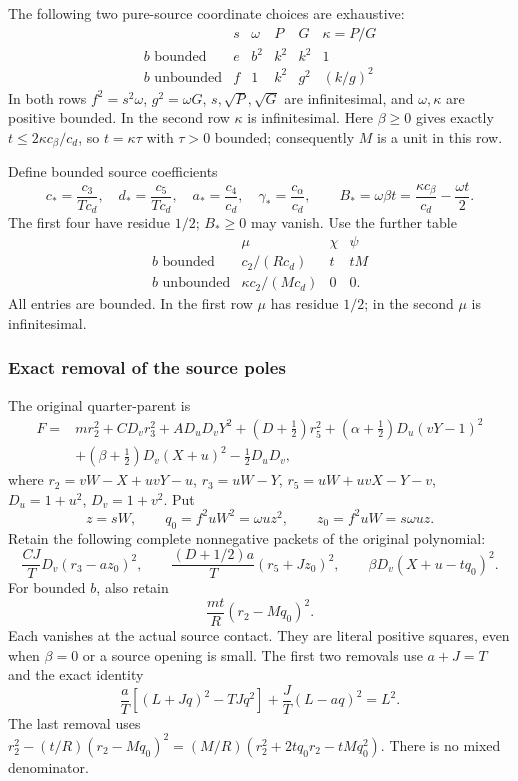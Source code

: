 The following two pure-source coordinate choices are exhaustive:
\[
\begin{array}{c|ccccc}
 &s&\omega&P&G&\kappa=P/G\\ \hline
 b\text{ bounded}&e&b^2&k^2&k^2&1\\
 b\text{ unbounded}&f&1&k^2&g^2&(k/g)^2
\end{array}                                                     \tag{EZ3}
\]
In both rows $f^2=s^2\omega$, $g^2=\omega G$,
$s,\sqrt P,\sqrt G$ are infinitesimal, and $\omega,\kappa$
are positive bounded. In the second row $\kappa$ is infinitesimal.
Here $\beta\geq0$ gives exactly
$t\leq2\kappa c_\beta/c_d$, so $t=\kappa\tau$ with
$\tau>0$ bounded; consequently $M$ is a unit in this row.

Define bounded source coefficients
\[
 c_*=\frac{c_3}{Tc_d},\quad d_*=\frac{c_5}{Tc_d},\quad
 a_*=\frac{c_4}{c_d},\quad \gamma_*=\frac{c_\alpha}{c_d},
 \qquad B_*=\omega\beta t
              =\frac{\kappa c_\beta}{c_d}-\frac{\omega t}{2}.
                                                               \tag{EZ4}
\]
The first four have residue $1/2$; $B_*\geq0$ may vanish.
Use the further table
\[
\begin{array}{c|ccc}
 &\mu&\chi&\psi\\ \hline
 b\text{ bounded}&c_2/(Rc_d)&t&tM\\
 b\text{ unbounded}&\kappa c_2/(Mc_d)&0&0 .
\end{array}                                                     \tag{EZ5}
\]
All entries are bounded. In the first row $\mu$ has residue
$1/2$; in the second $\mu$ is infinitesimal.

\subsubsection*{Exact removal of the source poles}

The original quarter-parent is
\[
\begin{split}
 F={}&mr_2^2+CD_vr_3^2+AD_uD_vY^2
 +(D+\tfrac12)r_5^2+(\alpha+\tfrac12)D_u(vY-1)^2\\
 &+(\beta+\tfrac12)D_v(X+u)^2-\tfrac12D_uD_v,
\end{split}                                                     \tag{EZ6}
\]
where $r_2=vW-X+uvY-u$, $r_3=uW-Y$,
$r_5=uW+uvX-Y-v$, $D_u=1+u^2$, $D_v=1+v^2$.
Put
\[
 z=sW,\qquad q_0=f^2uW^2=\omega uz^2,\qquad
 z_0=f^2uW=s\omega uz.
\]
Retain the following complete nonnegative packets of the original
polynomial:
\[
 \frac{CJ}{T}D_v(r_3-az_0)^2,\qquad
 \frac{(D+1/2)a}{T}(r_5+Jz_0)^2,\qquad
 \beta D_v(X+u-tq_0)^2.                                        \tag{EZ7}
\]
For bounded $b$, also retain
\[
                       \frac{mt}{R}(r_2-Mq_0)^2.              \tag{EZ8}
\]
Each vanishes at the actual source contact. They are literal
positive squares, even when $\beta=0$ or a source opening is small.
The first two removals use $a+J=T$ and the exact identity
\[
 \frac aT[(L+Jq)^2-TJq^2]+\frac JT(L-aq)^2=L^2.
\]
The last removal uses
$r_2^2-(t/R)(r_2-Mq_0)^2
=(M/R)(r_2^2+2tq_0r_2-tMq_0^2)$.
There is no mixed denominator.

